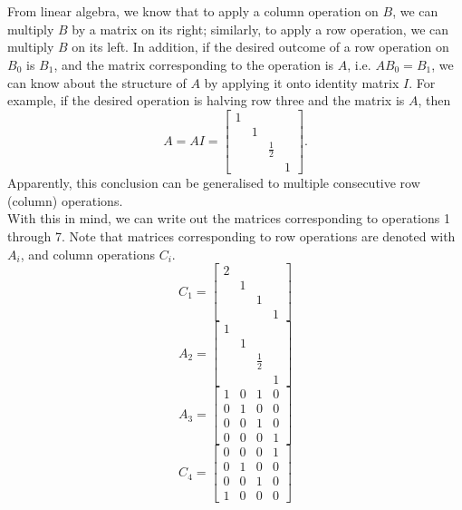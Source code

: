 \documentclass[11pt]{article}
\begin{document}
\maketitle
\section{}
\subsection{}
\subsubsection{}
From linear algebra, we know that to apply a column operation on $B$, we can multiply $B$ by a matrix on its right; similarly, to apply a row operation, we can multiply $B$ on its left. In addition, if the desired outcome of a row operation on $B_0$ is $B_1$, and the matrix corresponding to the operation is $A$, i.e. $AB_0=B_1$, we can know about the structure of $A$ by applying it onto identity matrix $I$. For example, if the desired operation is halving row three and the matrix is $A$, then $$A=AI=\begin{bmatrix} 1\\&1\\& &\frac12\\&&&1\end{bmatrix}.$$Apparently, this conclusion can be generalised to multiple consecutive row (column) operations.\\[0.5cm]
With this in mind, we can write out the matrices corresponding to operations 1 through 7. Note that matrices corresponding to row operations are denoted with $A_i$, and column operations $C_i$.
$$C_1=\begin{bmatrix} 2\\&1\\&&1\\&&&1\end{bmatrix} $$
$$A_2=\begin{bmatrix} 1\\&1\\& &\frac12\\&&&1\end{bmatrix}$$
$$A_3=\begin{bmatrix} 1&0&1&0\\0&1&0&0\\0&0&1&0\\0&0&0&1\end{bmatrix} $$
$$C_4=\begin{bmatrix} 0&0&0&1\\0&1&0&0\\0&0&1&0\\1&0&0&0\end{bmatrix} $$
\end{document}
